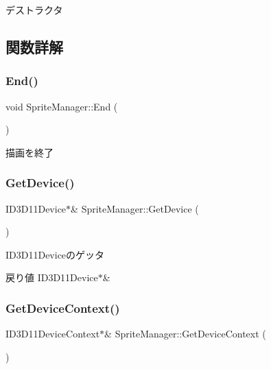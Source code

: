 デストラクタ 



\subsection{関数詳解}
\mbox{\label{class_sprite_manager_afed8a96a6530f67123a4efa1b6d77032}} 
\subsubsection{\texorpdfstring{End()}{End()}}
{\footnotesize\ttfamily void Sprite\+Manager\+::\+End (\begin{DoxyParamCaption}{ }\end{DoxyParamCaption})\hspace{0.3cm}{\ttfamily [inline]}}



描画を終了 

\mbox{\label{class_sprite_manager_ac9e2c44cc43775d9802612bd4be9bac3}} 
\subsubsection{\texorpdfstring{Get\+Device()}{GetDevice()}}
{\footnotesize\ttfamily I\+D3\+D11\+Device$\ast$\& Sprite\+Manager\+::\+Get\+Device (\begin{DoxyParamCaption}{ }\end{DoxyParamCaption})\hspace{0.3cm}{\ttfamily [inline]}}



I\+D3\+D11\+Deviceのゲッタ 

\begin{DoxyReturn}{戻り値}
I\+D3\+D11\+Device$\ast$\& 
\end{DoxyReturn}
\mbox{\label{class_sprite_manager_a6bad23e380818dbe6b521adc07ab84fa}} 
\subsubsection{\texorpdfstring{Get\+Device\+Context()}{GetDeviceContext()}}
{\footnotesize\ttfamily I\+D3\+D11\+Device\+Context$\ast$\& Sprite\+Manager\+::\+Get\+Device\+Context (\begin{DoxyParamCaption}{ }\end{DoxyParamCaption})\hspace{0.3cm}{\ttfamily [inline]}}



